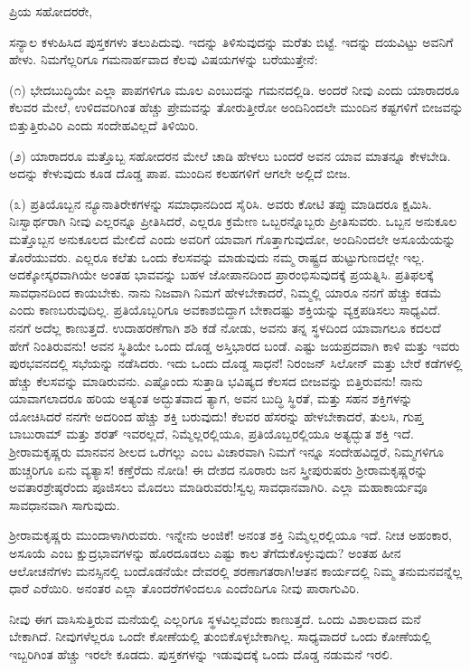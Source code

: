 \noindent
ಪ್ರಿಯ ಸಹೋದರರೇ,

ಸನ್ಯಾಲ ಕಳುಹಿಸಿದ ಪುಸ್ತಕಗಳು ತಲುಪಿದುವು. ಇದನ್ನು ತಿಳಿಸುವುದನ್ನು ಮರೆತು ಬಿಟ್ಟೆ. ಇದನ್ನು ದಯವಿಟ್ಟು ಅವನಿಗೆ ಹೇಳು. ನಿಮಗೆಲ್ಲರಿಗೂ ಗಮನಾರ್ಹವಾದ ಕೆಲವು ವಿಷಯಗಳನ್ನು ಬರೆಯುತ್ತೇನೆ:

(೧) ಭೇದಬುದ್ಧಿಯೇ ಎಲ್ಲಾ ಪಾಪಗಳಿಗೂ ಮೂಲ ಎಂಬುದನ್ನು ಗಮನದಲ್ಲಿಡಿ. ಅಂದರೆ ನೀವು ಎಂದು ಯಾರಾದರೂ ಕೆಲವರ ಮೇಲೆ, ಉಳಿದವರಿಗಿಂತ ಹೆಚ್ಚು ಪ್ರೇಮವನ್ನು ತೋರುತ್ತೀರೋ ಅಂದಿನಿಂದಲೇ ಮುಂದಿನ ಕಷ್ಟಗಳಿಗೆ ಬೀಜವನ್ನು ಬಿತ್ತುತ್ತಿರುವಿರಿ ಎಂದು ಸಂದೇಹವಿಲ್ಲದೆ ತಿಳಿಯಿರಿ.

(೨) ಯಾರಾದರೂ ಮತ್ತೊಬ್ಬ ಸಹೋದರನ ಮೇಲೆ ಚಾಡಿ ಹೇಳಲು ಬಂದರೆ ಅವನ ಯಾವ ಮಾತನ್ನೂ ಕೇಳಬೇಡಿ. ಅದನ್ನು ಕೇಳುವುದು ಕೂಡ ದೊಡ್ಡ ಪಾಪ. ಮುಂದಿನ ಕಲಹಗಳಿಗೆ ಆಗಲೇ ಅಲ್ಲಿದೆ ಬೀಜ.

(೩) ಪ್ರತಿಯೊಬ್ಬನ ನ್ಯೂನಾತಿರೇಕಗಳನ್ನು ಸಮಾಧಾನದಿಂದ ಸೈರಿಸಿ. ಅವರು ಕೋಟಿ ತಪ್ಪು ಮಾಡಿದರೂ ಕ್ಷಮಿಸಿ. ನಿಃಸ್ವಾರ್ಥರಾಗಿ ನೀವು ಎಲ್ಲರನ್ನೂ ಪ್ರೀತಿಸಿದರೆ, ಎಲ್ಲರೂ ಕ್ರಮೇಣ ಒಬ್ಬರನ್ನೊಬ್ಬರು ಪ್ರೀತಿಸುವರು. ಒಬ್ಬನ ಅನುಕೂಲ ಮತ್ತೊಬ್ಬನ ಅನುಕೂಲದ ಮೇಲಿದೆ ಎಂದು ಅವರಿಗೆ ಯಾವಾಗ ಗೊತ್ತಾಗುವುದೋ, ಅಂದಿನಿಂದಲೇ ಅಸೂಯೆಯನ್ನು ತೊರೆಯುವರು. ಎಲ್ಲರೂ ಕಲೆತು ಒಂದು ಕೆಲಸವನ್ನು ಮಾಡುವುದು ನಮ್ಮ ರಾಷ್ಟ್ರದ ಹುಟ್ಟುಗುಣದಲ್ಲೇ ಇಲ್ಲ. ಅದಕ್ಕೋಸ್ಕರವಾಗಿಯೇ ಅಂತಹ ಭಾವವನ್ನು ಬಹಳ ಜೋಪಾನದಿಂದ ಪ್ರಾರಂಭಿಸುವುದಕ್ಕೆ ಪ್ರಯತ್ನಿಸಿ. ಪ್ರತಿಫಲಕ್ಕೆ ಸಾವಧಾನದಿಂದ ಕಾಯಬೇಕು. ನಾನು ನಿಜವಾಗಿ ನಿಮಗೆ ಹೇಳಬೇಕಾದರೆ, ನಿಮ್ಮಲ್ಲಿ ಯಾರೂ ನನಗೆ ಹೆಚ್ಚು ಕಡಮೆ ಎಂದು ಕಾಣಬರುವುದಿಲ್ಲ. ಪ್ರತಿಯೊಬ್ಬರಿಗೂ ಅವಕಾಶಬಿದ್ದಾಗ ಬೇಕಾದಷ್ಟು ಶಕ್ತಿಯನ್ನು ವ್ಯಕ್ತಪಡಿಸಲು ಸಾಧ್ಯವಿದೆ. ನನಗೆ ಅದೆಲ್ಲ ಕಾಣುತ್ತದೆ. ಉದಾಹರಣೆಗಾಗಿ ಶಶಿ ಕಡೆ ನೋಡು, ಅವನು ತನ್ನ ಸ್ಥಳದಿಂದ ಯಾವಾಗಲೂ ಕದಲದೆ ಹೇಗೆ ನಿಂತಿರುವನು! ಅವನ ಸ್ಥಿತಿಯೇ ಒಂದು ದೊಡ್ಡ ಅಸ್ತಿಭಾರದ ಬಂಡೆ. ಎಷ್ಟು ಜಯಪ್ರದವಾಗಿ ಕಾಳಿ ಮತ್ತು ಇವರು ಪುರಭವನದಲ್ಲಿ ಸಭೆಯನ್ನು ನಡೆಸಿದರು. ಇದು ಒಂದು ದೊಡ್ಡ ಸಾಧನೆ! ನಿರಂಜನ್ ಸಿಲೋನ್ ಮತ್ತು ಬೇರೆ ಕಡೆಗಳಲ್ಲಿ ಹೆಚ್ಚು ಕೆಲಸವನ್ನು ಮಾಡಿರುವನು. ಎಷ್ಟೊಂದು ಸುತ್ತಾಡಿ ಭವಿಷ್ಯದ ಕೆಲಸದ ಬೀಜವನ್ನು ಬಿತ್ತಿರುವನು! ನಾನು ಯಾವಾಗಲಾದರೂ ಹರಿಯ ಅತ್ಯಂತ ಅದ್ಭುತವಾದ ತ್ಯಾಗ, ಅವನ ಬುದ್ಧಿ ಸ್ಥಿರತೆ, ಮತ್ತು ಸಹನ ಶಕ್ತಿಗಳನ್ನು ಯೋಚಿಸಿದರೆ ನನಗೇ ಅದರಿಂದ ಹೆಚ್ಚು ಶಕ್ತಿ ಬರುವುದು! ಕೆಲವರ ಹೆಸರನ್ನು ಹೇಳಬೇಕಾದರೆ, ತುಲಸಿ, ಗುಪ್ತ ಬಾಬುರಾಮ್ ಮತ್ತು ಶರತ್‌ ಇವರಲ್ಲದೆ, ನಿಮ್ಮೆಲ್ಲರಲ್ಲಿಯೂ, ಪ್ರತಿಯೊಬ್ಬರಲ್ಲಿಯೂ ಅತ್ಯದ್ಭುತ ಶಕ್ತಿ ಇದೆ. ಶ‍್ರೀರಾಮಕೃಷ್ಣರು ಮಾನವನ ಶೀಲದ ಒರೆಗಲ್ಲು ಎಂಬ ವಿಚಾರವಾಗಿ ನಿಮಗೆ ಇನ್ನೂ ಸಂದೇಹವಿದ್ದರೆ, ನಿಮ್ಮಗಳಿಗೂ ಹುಚ್ಚರಿಗೂ ಏನು ವ್ಯತ್ಯಾಸ! ಕಣ್ತೆರೆದು ನೋಡಿ! ಈ ದೇಶದ ನೂರಾರು ಜನ ಸ್ತ್ರೀಪುರುಷರು ಶ‍್ರೀರಾಮಕೃಷ್ಣರನ್ನು ಅವತಾರಶ್ರೇಷ್ಠರೆಂದು ಪೂಜಿಸಲು ಮೊದಲು ಮಾಡಿರುವರು!ಸ್ವಲ್ಪ ಸಾವಧಾನವಾಗಿರಿ. ಎಲ್ಲಾ ಮಹಾಕಾರ್ಯವೂ ಸಾವಧಾನವಾಗಿ ಸಾಗುವುದು.

ಶ‍್ರೀರಾಮಕೃಷ್ಣರು ಮುಂದಾಳಾಗಿರುವರು. ಇನ್ನೇನು ಅಂಜಿಕೆ! ಅನಂತ ಶಕ್ತಿ ನಿಮ್ಮೆಲ್ಲ\break ರಲ್ಲಿಯೂ ಇದೆ. ನೀಚ ಅಹಂಕಾರ, ಅಸೂಯೆ ಎಂಬ ಕ್ಷುದ್ರಭಾವಗಳನ್ನು ಹೊರದೂಡಲು ಎಷ್ಟು ಕಾಲ ತೆಗೆದುಕೊಳ್ಳುವುದು? ಅಂತಹ ಹೀನ ಆಲೋಚನೆಗಳು ಮನಸ್ಸಿನಲ್ಲಿ ಬಂದೊಡನೆಯೇ ದೇವರಲ್ಲಿ ಶರಣಾಗತರಾಗಿ!ಆತನ ಕಾರ್ಯದಲ್ಲಿ ನಿಮ್ಮ ತನುಮನವನ್ನೆಲ್ಲ ಧಾರೆ ಎರೆಯಿರಿ. ಅನಂತರ ಎಲ್ಲಾ ತೊಂದರೆಗಳಿಂದಲೂ ಎಂದೆಂದಿಗೂ ನೀವು ಪಾರಾಗುವಿರಿ.

ನೀವು ಈಗ ವಾಸಿಸುತ್ತಿರುವ ಮನೆಯಲ್ಲಿ ಎಲ್ಲರಿಗೂ ಸ್ಥಳವಿಲ್ಲವೆಂದು ಕಾಣುತ್ತದೆ. ಒಂದು ವಿಶಾಲವಾದ ಮನೆ ಬೇಕಾಗಿದೆ. ನೀವುಗಳೆಲ್ಲರೂ ಒಂದೇ ಕೋಣೆಯಲ್ಲಿ ತುಂಬಿಕೊಳ್ಳಬೇಕಾಗಿಲ್ಲ. ಸಾಧ್ಯವಾದರೆ ಒಂದು ಕೋಣೆಯಲ್ಲಿ ಇಬ್ಬರಿಗಿಂತ ಹೆಚ್ಚು ಇರಲೇ ಕೂಡದು. ಪುಸ್ತಕಗಳನ್ನು ಇಡುವುದಕ್ಕೆ ಒಂದು ದೊಡ್ಡ ನಡುಮನೆ ಇರಲಿ.

